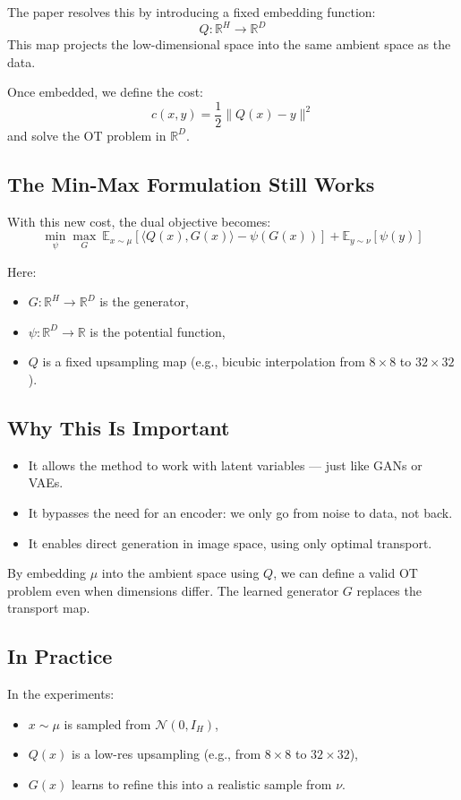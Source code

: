 \documentclass[11pt]{article}
\begin{document}
The paper resolves this by introducing a fixed embedding function:
\[
Q : \mathbb{R}^H \to \mathbb{R}^D
\]
This map projects the low-dimensional space into the same ambient space as the data.

Once embedded, we define the cost:
\[
c(x, y) = \frac{1}{2} \|Q(x) - y\|^2
\]
and solve the OT problem in $\mathbb{R}^D$.

\subsection*{The Min-Max Formulation Still Works}

With this new cost, the dual objective becomes:
\[
\min_{\psi} \max_{G} \ 
\mathbb{E}_{x \sim \mu} \left[ \langle Q(x), G(x) \rangle - \psi(G(x)) \right] + 
\mathbb{E}_{y \sim \nu} \left[ \psi(y) \right]
\]

Here:
\begin{itemize}
  \item $G : \mathbb{R}^H \to \mathbb{R}^D$ is the generator,
  \item $\psi : \mathbb{R}^D \to \mathbb{R}$ is the potential function,
  \item $Q$ is a fixed upsampling map (e.g., bicubic interpolation from $8\times8$ to $32\times32$).
\end{itemize}

\subsection*{Why This Is Important}

\begin{itemize}
  \item It allows the method to work with latent variables — just like GANs or VAEs.
  \item It bypasses the need for an encoder: we only go from noise to data, not back.
  \item It enables direct generation in image space, using only optimal transport.
\end{itemize}

\begin{tcolorbox}[colback=blue!5!white, colframe=blue!80!black, title=Key Idea]
By embedding $\mu$ into the ambient space using $Q$, we can define a valid OT problem even when dimensions differ.
The learned generator $G$ replaces the transport map.
\end{tcolorbox}

\subsection*{In Practice}
In the experiments:
\begin{itemize}
  \item $x \sim \mu$ is sampled from $\mathcal{N}(0, I_H)$,
  \item $Q(x)$ is a low-res upsampling (e.g., from $8\times8$ to $32\times32$),
  \item $G(x)$ learns to refine this into a realistic sample from $\nu$.
\end{itemize}
\end{document}
